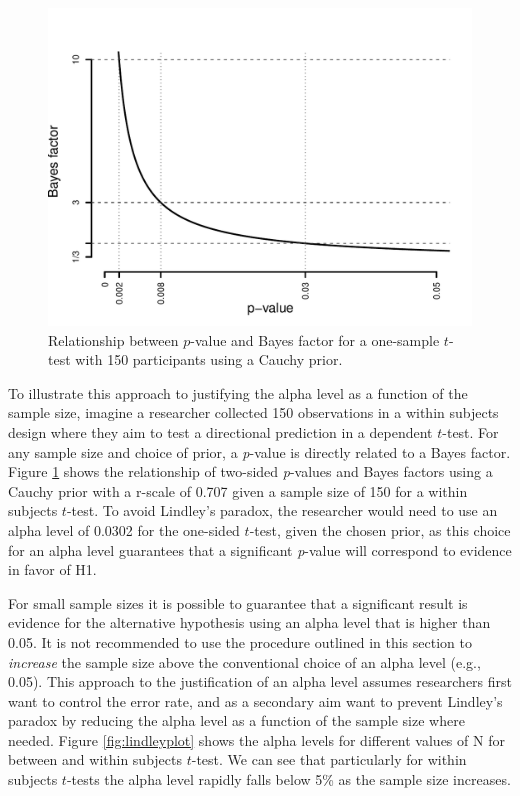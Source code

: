 \documentclass[
  english,
  ,man, a4paper,floatsintext]{apa6}
\begin{document}
\begin{figure}
\centering
\includegraphics{Justify_in_Practice_files/figure-latex/Lindley150-1.pdf}
\caption{\label{fig:Lindley150}Relationship between \(p\)-value and Bayes factor for a one-sample \(t\)-test with 150 participants using a Cauchy prior.}
\end{figure}

To illustrate this approach to justifying the alpha level as a function of the sample size, imagine a researcher collected 150 observations in a within subjects design where they aim to test a directional prediction in a dependent \(t\)-test. For any sample size and choice of prior, a \emph{p}-value is directly related to a Bayes factor. Figure \ref{fig:Lindley150} shows the relationship of two-sided \emph{p}-values and Bayes factors using a Cauchy prior with a r-scale of 0.707 given a sample size of 150 for a within subjects \(t\)-test. To avoid Lindley's paradox, the researcher would need to use an alpha level of 0.0302 for the one-sided \(t\)-test, given the chosen prior, as this choice for an alpha level guarantees that a significant \emph{p}-value will correspond to evidence in favor of H1.

For small sample sizes it is possible to guarantee that a significant result is evidence for the alternative hypothesis using an alpha level that is higher than 0.05. It is not recommended to use the procedure outlined in this section to \emph{increase} the sample size above the conventional choice of an alpha level (e.g., 0.05). This approach to the justification of an alpha level assumes researchers first want to control the error rate, and as a secondary aim want to prevent Lindley's paradox by reducing the alpha level as a function of the sample size where needed. Figure \ref{fig:lindleyplot} shows the alpha levels for different values of N for between and within subjects \(t\)-test. We can see that particularly for within subjects \(t\)-tests the alpha level rapidly falls below 5\% as the sample size increases.
\end{document}
